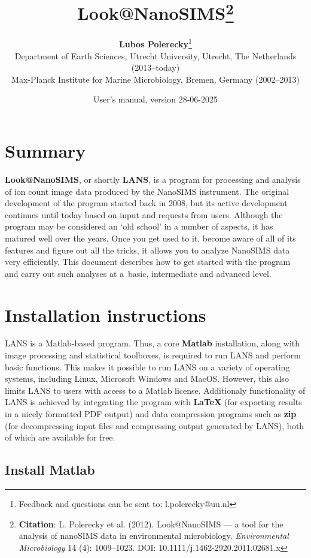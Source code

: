 \documentclass[a4paper, 11pt]{article}
\title{{\LARGE \bf Look@NanoSIMS}\footnote{\textbf{Citation}: L. Polerecky et al. (2012). Look@NanoSIMS --- a tool for the analysis of nanoSIMS data in environmental microbiology. \textit{Environmental Microbiology} 14 (4): 1009--1023. DOI: 10.1111/j.1462-2920.2011.02681.x}}
\author{{\large\bf Lubos Polerecky}\footnote{Feedback and questions can be sent to: l.polerecky@uu.nl}\\[6mm]
{\small Department of Earth Sciences, Utrecht University, Utrecht, The Netherlands (2013--today)} \\%
{\small Max-Planck Institute for Marine Microbiology, Bremen, Germany (2002--2013)}\\[3mm]}
\date{User's manual, version 28-06-2025}
\begin{document}
\maketitle
\reversemarginpar 


\section*{Summary}
\textbf{Look@NanoSIMS}, or shortly \textbf{LANS}, is a program for processing and analysis of ion count image data produced by the NanoSIMS instrument. The original development of the program started back in 2008, but its active development continues until today based on input and requests from users. Although the program may be considered an `old school' in a number of aspects, it has matured well over the years. Once you get used to it, become aware of all of its features and figure out all the tricks, it allows you to analyze NanoSIMS data very efficiently. This document describes how to get started with the program and carry out such analyses at a~basic, intermediate and advanced level. 


\tableofcontents

\section{Installation instructions}

LANS is a Matlab-based program. Thus, a core \textbf{Matlab} installation, along with image processing and statistical toolboxes, is required to run LANS and perform basic functions. This makes it possible to run LANS on a variety of operating systems, including Linux, Microsoft Windows and MacOS. However, this also limits LANS to users with access to a Matlab license. Additionaly functionality of LANS is achieved by integrating the program with \textbf{\LaTeX} (for exporting results in a nicely formatted PDF output) and data compression programs such as \textbf{zip} (for decompressing input files and compressing output generated by LANS), both of which are available for free.


\subsection{Install Matlab}
\end{document}

